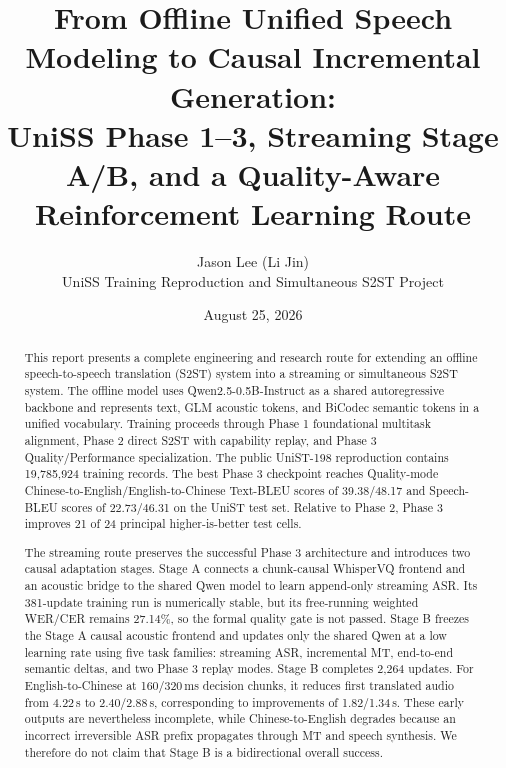\documentclass[11pt,a4paper]{article}
\title{\textbf{From Offline Unified Speech Modeling to Causal Incremental Generation: \\
UniSS Phase 1--3, Streaming Stage A/B, and a Quality-Aware Reinforcement Learning Route}}
\author{Jason Lee (Li Jin)\\
\small UniSS Training Reproduction and Simultaneous S2ST Project}
\date{August 25, 2026}
\begin{document}
\maketitle

\begin{abstract}
This report presents a complete engineering and research route for extending an offline speech-to-speech translation (S2ST) system into a streaming or simultaneous S2ST system. The offline model uses Qwen2.5-0.5B-Instruct as a shared autoregressive backbone and represents text, GLM acoustic tokens, and BiCodec semantic tokens in a unified vocabulary. Training proceeds through Phase 1 foundational multitask alignment, Phase 2 direct S2ST with capability replay, and Phase 3 Quality/Performance specialization. The public UniST-198 reproduction contains 19,785,924 training records. The best Phase 3 checkpoint reaches Quality-mode Chinese-to-English/English-to-Chinese Text-BLEU scores of 39.38/48.17 and Speech-BLEU scores of 22.73/46.31 on the UniST test set. Relative to Phase 2, Phase 3 improves 21 of 24 principal higher-is-better test cells.

The streaming route preserves the successful Phase 3 architecture and introduces two causal adaptation stages. Stage A connects a chunk-causal WhisperVQ frontend and an acoustic bridge to the shared Qwen model to learn append-only streaming ASR. Its 381-update training run is numerically stable, but its free-running weighted WER/CER remains 27.14\%, so the formal quality gate is not passed. Stage B freezes the Stage A causal acoustic frontend and updates only the shared Qwen at a low learning rate using five task families: streaming ASR, incremental MT, end-to-end semantic deltas, and two Phase 3 replay modes. Stage B completes 2,264 updates. For English-to-Chinese at 160/320\,ms decision chunks, it reduces first translated audio from 4.22\,s to 2.40/2.88\,s, corresponding to improvements of 1.82/1.34\,s. These early outputs are nevertheless incomplete, while Chinese-to-English degrades because an incorrect irreversible ASR prefix propagates through MT and speech synthesis. We therefore do not claim that Stage B is a bidirectional overall success.


\end{abstract}
\end{document}
